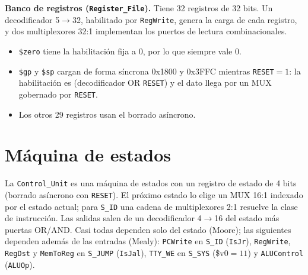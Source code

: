 \documentclass[10pt,a4paper]{article}
\newcommand{\s}[1]{\texttt{#1}}
\begin{document}
\noindent\textbf{Banco de registros (\s{Register\_File}).} Tiene 32 registros de 32 bits.
Un decodificador 5$\to$32, habilitado por \s{RegWrite}, genera la carga de cada registro,
y dos multiplexores 32:1 implementan los puertos de lectura combinacionales.
\begin{itemize}
\item \s{\$zero} tiene la habilitación fija a 0, por lo que siempre vale 0.
\item \s{\$gp} y \s{\$sp} cargan de forma síncrona 0x1800 y 0x3FFC mientras \s{RESET}$=1$:
la habilitación es (decodificador OR \s{RESET}) y el dato llega por un MUX gobernado
por \s{RESET}.
\item Los otros 29 registros usan el borrado asíncrono.
\end{itemize}

\section{Máquina de estados}

La \s{Control\_Unit} es una máquina de estados con un registro de estado de 4 bits
(borrado asíncrono con \s{RESET}). El próximo estado lo elige un MUX 16:1 indexado por el
estado actual; para \s{S\_ID} una cadena de multiplexores 2:1 resuelve la clase de
instrucción. Las salidas salen de un decodificador 4$\to$16 del estado más puertas OR/AND.
Casi todas dependen solo del estado (Moore); las siguientes dependen además de las entradas (Mealy):
\s{PCWrite} en \s{S\_ID} (\s{IsJr}), \s{RegWrite}, \s{RegDst} y \s{MemToReg} en \s{S\_JUMP}
(\s{IsJal}), \s{TTY\_WE} en \s{S\_SYS} (\$v0$=11$) y \s{ALUControl} (\s{ALUOp}).
\end{document}
